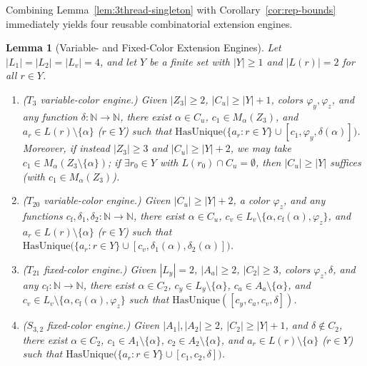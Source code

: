 \documentclass[11pt,a4paper]{article}
\newtheorem{lemma}[theorem]{Lemma}
\theoremstyle{definition}
\newcommand{\N}{\mathbb{N}}
\begin{document}
Combining Lemma~\ref{lem:3thread-singleton} with Corollary~\ref{cor:rep-bounds} immediately yields four reusable combinatorial extension engines.

\begin{lemma}[Variable- and Fixed-Color Extension Engines]\label{lem:engines}
Let $|L_1| = |L_2| = |L_v| = 4$, and let $Y$ be a finite set with $|Y| \ge 1$ and $|L(r)| = 2$ for all $r \in Y$.
\begin{enumerate}[label=(\alph*),leftmargin=*,itemsep=2pt]
  \item \emph{($T_3$ variable-color engine.)} Given $|Z_3| \ge 2$, $|C_u| \ge |Y| + 1$, colors $\varphi_y, \varphi_z$, and any function $\delta : \N \to \N$, there exist $\alpha \in C_u$, $c_1 \in M_\alpha(Z_3)$, and $a_r \in L(r) \setminus \{\alpha\}$ ($r \in Y$) such that $\mathrm{HasUnique}\bigl(\{a_r : r \in Y\} \cup [c_1, \varphi_y, \delta(\alpha)]\bigr)$. Moreover, if instead $|Z_3| \ge 3$ and $|C_u| \ge |Y| + 2$, we may take $c_1 \in M_\alpha(Z_3 \setminus \{\alpha\})$; if $\exists r_0 \in Y$ with $L(r_0) \cap C_u = \emptyset$, then $|C_u| \ge |Y|$ suffices (with $c_1 \in M_\alpha(Z_3)$).
  \item \emph{($T_{20}$ variable-color engine.)} Given $|C_u| \ge |Y| + 2$, a color $\varphi_z$, and any functions $c_{\mathrm{f}}, \delta_1, \delta_2 : \N \to \N$, there exist $\alpha \in C_u$, $c_v \in L_v \setminus \{\alpha, c_{\mathrm{f}}(\alpha), \varphi_z\}$, and $a_r \in L(r) \setminus \{\alpha\}$ ($r \in Y$) such that $\mathrm{HasUnique}\bigl(\{a_r : r \in Y\} \cup [c_v, \delta_1(\alpha), \delta_2(\alpha)]\bigr)$.
  \item \emph{($T_{21}$ fixed-color engine.)} Given $|L_y| = 2$, $|A_a| \ge 2$, $|C_2| \ge 3$, colors $\varphi_z, \delta$, and any $c_{\mathrm{f}} : \N \to \N$, there exist $\alpha \in C_2$, $c_y \in L_y \setminus \{\alpha\}$, $c_a \in A_a \setminus \{\alpha\}$, and $c_v \in L_v \setminus \{\alpha, c_{\mathrm{f}}(\alpha), \varphi_z\}$ such that $\mathrm{HasUnique}([c_y, c_a, c_v, \delta])$.
  \item \emph{($S_{3,2}$ fixed-color engine.)} Given $|A_1|, |A_2| \ge 2$, $|C_2| \ge |Y| + 1$, and $\delta \notin C_2$, there exist $\alpha \in C_2$, $c_1 \in A_1 \setminus \{\alpha\}$, $c_2 \in A_2 \setminus \{\alpha\}$, and $a_r \in L(r) \setminus \{\alpha\}$ ($r \in Y$) such that $\mathrm{HasUnique}\bigl(\{a_r : r \in Y\} \cup [c_1, c_2, \delta]\bigr)$.
\end{enumerate}
\end{lemma}
\end{document}
